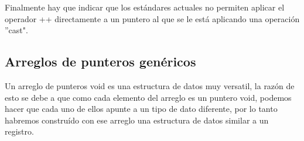 \documentclass[12pt ]{article}
\begin{document}
Finalmente hay que indicar que los estándares actuales no permiten aplicar el operador ++ directamente a un puntero al que se le está aplicando una operación ''cast".
\subsection{Arreglos de punteros genéricos}
Un arreglo de punteros void es una estructura de datos muy versatil, la razón de esto se debe a que como cada elemento del arreglo es un puntero void, podemos hacer que cada uno de ellos apunte a un tipo de dato diferente, por lo tanto habremos construído con ese arreglo una estructura de datos similar a un registro.
\end{document}
